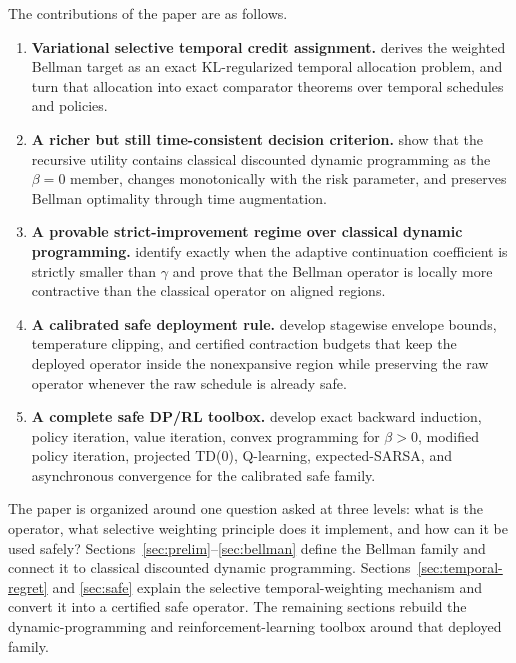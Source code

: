 \documentclass{article}
\theoremstyle{remark}
\begin{document}
The contributions of the paper are as follows.
\begin{enumerate}[leftmargin=1.5em,itemsep=2pt]
    \item \textbf{Variational selective temporal credit assignment.}
     derives the weighted Bellman target as an exact KL-regularized temporal allocation problem, and  turn that allocation into exact comparator theorems over temporal schedules and policies.
    \item \textbf{A richer but still time-consistent decision criterion.}
     show that the recursive utility contains classical discounted dynamic programming as the $\beta=0$ member, changes monotonically with the risk parameter, and preserves Bellman optimality through time augmentation.
    \item \textbf{A provable strict-improvement regime over classical dynamic programming.}
     identify exactly when the adaptive continuation coefficient is strictly smaller than $\gamma$ and prove that the Bellman operator is locally more contractive than the classical operator on aligned regions.
    \item \textbf{A calibrated safe deployment rule.}
     develop stagewise envelope bounds, temperature clipping, and certified contraction budgets that keep the deployed operator inside the nonexpansive region while preserving the raw operator whenever the raw schedule is already safe.
    \item \textbf{A complete safe DP/RL toolbox.}
     develop exact backward induction, policy iteration, value iteration, convex programming for $\beta>0$, modified policy iteration, projected TD(0), Q-learning, expected-SARSA, and asynchronous convergence for the calibrated safe family.
\end{enumerate}

The paper is organized around one question asked at three levels: what is the operator, what selective weighting principle does it implement, and how can it be used safely? Sections~\ref{sec:prelim}--\ref{sec:bellman} define the Bellman family and connect it to classical discounted dynamic programming. Sections~\ref{sec:temporal-regret} and \ref{sec:safe} explain the selective temporal-weighting mechanism and convert it into a certified safe operator. The remaining sections rebuild the dynamic-programming and reinforcement-learning toolbox around that deployed family.
\end{document}
